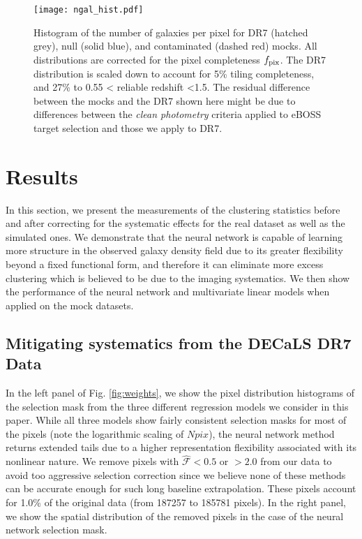 \documentclass[fleqn, usenatbib]{mnras}
\begin{document}
\begin{figure}
    \centering
    \texttt{[image: ngal\_hist.pdf]}
    \caption{Histogram of the number of galaxies per pixel for DR7 (hatched grey), null (solid blue), and contaminated (dashed red) mocks. All distributions are corrected for the pixel completeness $f_{\rm pix}$. The DR7 distribution is scaled down to account for 5\% tiling completeness, and 27\% to 0.55 < reliable redshift <1.5. The residual difference between the mocks and the DR7 shown here might be due to differences between the \textit{clean photometry} criteria applied to eBOSS target selection and those we apply to DR7.}
    \label{fig:ngal_hist}
\end{figure}{}
\section{Results}\label{sec:results}
In this section, we present the measurements of the clustering statistics before and after correcting for the systematic effects for the real dataset as well as the simulated ones. We demonstrate that the neural network is capable of learning more structure in the observed galaxy density field due to its greater flexibility beyond a fixed functional form, and therefore it can eliminate more excess clustering which is believed to be due to the imaging systematics. We then show the performance of the neural network and multivariate linear models when applied on the mock datasets.

\subsection{Mitigating systematics from the DECaLS DR7 Data}
\label{sec:mitigateDR7}
In the left panel of Fig. \ref{fig:weights}, we show the pixel distribution histograms of the selection mask from the three different regression models we consider in this paper. While all three models show fairly consistent selection masks for most of the pixels (note the logarithmic scaling of $Npix$), the neural network method returns extended tails due to a higher representation flexibility associated with its nonlinear nature.  We remove pixels with $\hat{\mathcal{F}} < 0.5$ or $> 2.0$ from our data to avoid too aggressive selection correction since we believe none of these methods can be accurate enough for such long baseline extrapolation. These pixels account for 1.0\% of the original data (from 187257 to 185781 pixels). In the right panel, we show the spatial distribution of the removed pixels in the case of the neural network selection mask. \\
\end{document}
